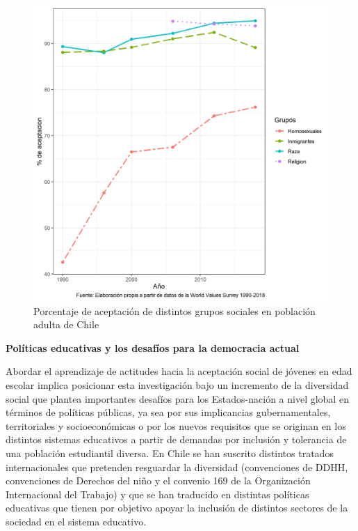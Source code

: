 \documentclass[12pt,twoside]{templates/facsothesis}
\begin{document}
\begin{figure}[H]

{\centering \includegraphics[width=1\linewidth]{images/aceptacion_wvs} 

}

\caption{Porcentaje de aceptación de distintos grupos sociales en población adulta de Chile}\label{fig:aceptacion-wvs}
\end{figure}

\textbf{Políticas educativas y los desafíos para la democracia actual}

Abordar el aprendizaje de actitudes hacia la aceptación social de jóvenes en edad escolar implica posicionar esta investigación bajo un incremento de la diversidad social que plantea importantes desafíos para los Estados-nación a nivel global en términos de políticas públicas, ya sea por sus implicancias gubernamentales, territoriales y socioeconómicas o por los nuevos requisitos que se originan en los distintos sistemas educativos a partir de demandas por inclusión y tolerancia de una población estudiantil diversa. En Chile se han suscrito distintos tratados internacionales que pretenden resguardar la diversidad (convenciones de DDHH, convenciones de Derechos del niño y el convenio 169 de la Organización Internacional del Trabajo) y que se han traducido en distintas políticas educativas que tienen por objetivo apoyar la inclusión de distintos sectores de la sociedad en el sistema educativo.
\end{document}
